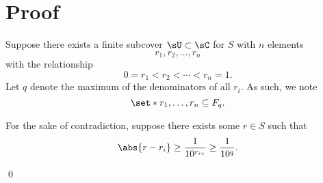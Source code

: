 \documentclass{article}
\newcommand{\Rt}[1]{\dfrac{1}{10^{#1}}}
\begin{document}
\section{Proof}
Suppose there exists a finite subcover $\sU \subset \sC$ for $S$ with $n$ elements
\[ r_{1}, r_{2}, \ldots, r_{n} \]
with the relationship
\[ 0 = r_{1} < r_{2} < \cdots < r_{n} = 1. \]
Let $q$ denote the maximum of the denominators of all $r_{i}$.
As such, we note
\[ \set*{r_{1}, \ldots, r_{n}} \subseteq F_{q}. \]

For the sake of contradiction, suppose there exists some $r \in S$ such that
\[ \abs{r - r_{i}} \ge \Rt{r_{i\gamma}} \ge \Rt{q}. \]



\qed{}


\end{document}
